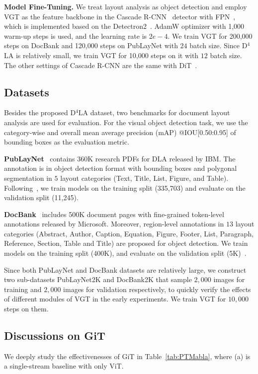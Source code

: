 \documentclass[10pt,twocolumn,letterpaper]{article}
\begin{document}
\noindent
\textbf{Model Fine-Tuning.} 
We treat layout analysis as object detection
and employ VGT as the feature backbone in the Cascade R-CNN~\cite{cascade} detector with FPN~\cite{FPN},
which is implemented based on the Detectron2~\cite{Detectron2}.
AdamW optimizer with 1,000 warm-up steps is used, and the learning rate is $2e-4$.
We train VGT for 200,000 steps on DocBank and 120,000 steps on PubLayNet with $24$ batch size.
Since D$^4$LA is relatively small, we train VGT for 10,000 steps on it with $12$ batch size.
The other settings of Cascade R-CNN are the same with DiT~\cite{li2022dit}. 

\subsection{Datasets}
Besides the proposed D$^4$LA dataset, two benchmarks for document layout analysis are used for evaluation.
For the visual object detection task,
we use the category-wise and overall mean average precision (mAP) @IOU[0.50:0.95] of bounding boxes as the evaluation metric.

\noindent
\textbf{PubLayNet}~\cite{zhong2019publaynet} contains 360K research PDFs for DLA released by IBM.
The annotation is in object detection format with bounding boxes and polygonal segmentation in $5$ layout categories (Text, Title, List, Figure, and Table). 
Following~\cite{gu2021unidoc,li2022dit,zhong2019publaynet}, we train models on the training split (335,703) and evaluate on the validation split (11,245).

\noindent
\textbf{DocBank}~\cite{li2020docbank} includes 500K document pages with fine-grained token-level
annotations released by Microsoft.
Moreover, region-level annotations in $13$ layout categories (Abstract, Author, Caption, Equation, Figure, Footer,
List, Paragraph, Reference, Section, Table and Title) are proposed for object detection.
We train models on the training split (400K), and evaluate on the validation split (5K)~\cite{li2020docbank}.


Since both PubLayNet and DocBank datasets are relatively large, 
we construct two sub-datasets PubLayNet2K and DocBank2K 
that sample $2,000$ images for training and $2,000$ images for validation respectively, 
to quickly verify the effects of different modules of VGT in the early experiments. 
We train VGT for $10,000$ steps on them.

\subsection{Discussions on GiT}
We deeply study the effectivenesses of GiT in Table~\ref{tab:PTMabla}, 
where (a) is a single-stream baseline with only ViT.
\end{document}
